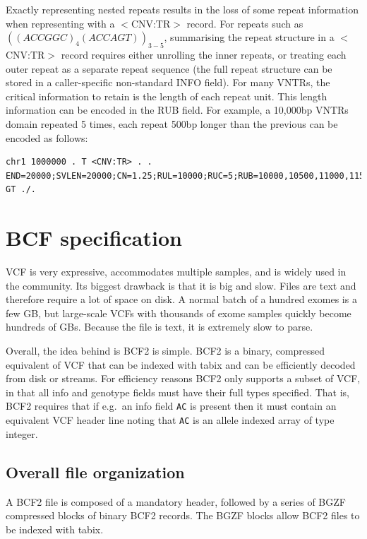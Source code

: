 \documentclass[8pt]{article}
\begin{document}
Exactly representing nested repeats results in the loss of some repeat information when representing with a $<$CNV:TR$>$ record.
For repeats such as $((ACCGGC)_{4}(ACCAGT))_{3-5}$, summarising the repeat structure in a $<$CNV:TR$>$ record requires either unrolling the inner repeats, or treating each outer repeat as a separate repeat sequence (the full repeat structure can be stored in a caller-specific non-standard INFO field).
For many VNTRs, the critical information to retain is the length of each repeat unit.
This length information can be encoded in the RUB field.
For example, a 10,000bp VNTRs domain repeated 5 times, each repeat 500bp longer than the previous can be encoded as follows:

\footnotesize
\begin{verbatim}
chr1 1000000 . T <CNV:TR> . . END=20000;SVLEN=20000;CN=1.25;RUL=10000;RUC=5;RUB=10000,10500,11000,11500,12000 GT ./.
\end{verbatim}
\normalsize


	
	
\pagebreak
\section{BCF specification}

VCF is very expressive, accommodates multiple samples, and is widely used in the community.
Its biggest drawback is that it is big and slow.
Files are text and therefore require a lot of space on disk.
A normal batch of a hundred exomes is a few GB, but large-scale VCFs with thousands of exome samples quickly become hundreds of GBs.
Because the file is text, it is extremely slow to parse.

Overall, the idea behind is BCF2 is simple.
BCF2 is a binary, compressed equivalent of VCF that can be indexed with tabix and can be efficiently decoded from disk or streams.
For efficiency reasons BCF2 only supports a subset of VCF, in that all info and genotype fields must have their full types specified.
That is, BCF2 requires that if e.g.\ an info field {\tt AC} is present then it must contain an equivalent VCF header line noting that {\tt AC} is an allele indexed array of type integer.

\subsection{Overall file organization}

A BCF2 file is composed of a mandatory header, followed by a series of BGZF compressed blocks of binary BCF2 records.
The BGZF blocks allow BCF2 files to be indexed with tabix.
\end{document}

